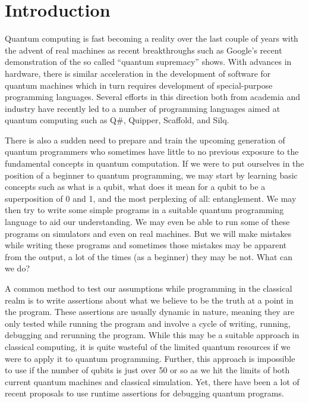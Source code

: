 \documentclass[adraft,creativecommons]{eptcs}
\title{\titlerunning}
\author{
\authorrunning
\institute{University of Chicago}
\email{\mailtodomain{ks@cs.uchicago.edu}}
}
\theoremstyle{definition}
\theoremstyle{remark}
\begin{document}
\maketitle

\begin{abstract}
    \blindtext
\end{abstract}

\thispagestyle{empty}

\tableofcontents

\listoftables

\listoffigures

\lstlistoflistings


\section{Introduction}

Quantum computing is fast becoming a reality over the last couple of years with the advent of real machines as recent breakthroughs such as Google's recent demonstration of the so called ``quantum supremacy'' shows. With advances in hardware, there is similar acceleration in the development of software for quantum machines which in turn requires development of special-purpose programming languages. Several efforts in this direction both from academia and industry have recently led to a number of programming languages aimed at quantum computing such as Q\#, Quipper, Scaffold, and Silq.

There is also a sudden need to prepare and train the upcoming generation of quantum programmers who sometimes have little to no previous exposure to the fundamental concepts in quantum computation. If we were to put ourselves in the position of a beginner to quantum programming, we may start by learning basic concepts such as what is a qubit, what does it mean for a qubit to be a superposition of 0 and 1, and the most perplexing of all: entanglement. We may then try to write some simple programs in a suitable quantum programming language to aid our understanding. We may even be able to run some of these programs on simulators and even on real machines. But we will make mistakes while writing these programs and sometimes those mistakes may be apparent from the output, a lot of the times (as a beginner) they may be not. What can we do?

A common method to test our assumptions while programming in the classical realm is to write assertions about what we believe to be the truth at a point in the program. These assertions are usually dynamic in nature, meaning they are only tested while running the program and involve a cycle of writing, running, debugging and rerunning the program. While this may be a suitable approach in classical computing, it is quite wasteful of the limited quantum resources if we were to apply it to quantum programming. Further, this approach is impossible to use if the number of qubits is just over 50 or so as we hit the limits of both current quantum machines and classical simulation. Yet, there have been a lot of recent proposals to use runtime assertions for debugging quantum programs.
\end{document}
